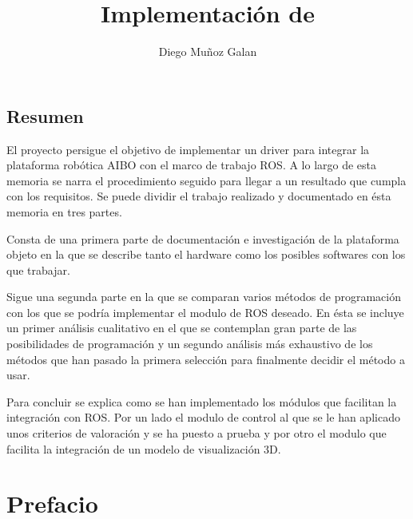 \documentclass[12pt,a4paper,final,twoside]{book}
\title{Implementación de }
\author{Diego Muñoz Galan}
\begin{document}
\maketitle
\thispagestyle{empty}

\newpage
\paragraph{}
\thispagestyle{empty}
\cleardoublepage

\setcounter{page}{1}
\begin{center}
\section*{Resumen}
\end{center}

El proyecto persigue el objetivo de implementar un driver para integrar la plataforma robótica AIBO con el marco de trabajo ROS. A lo largo de esta memoria se narra el procedimiento seguido para llegar a un resultado que cumpla con los requisitos. 
Se puede dividir el trabajo realizado y documentado en ésta memoria en tres partes.

Consta de una primera parte de documentación e investigación de la plataforma objeto en la que se describe tanto el hardware como los posibles softwares con los que trabajar.

Sigue una segunda parte en la que se comparan varios métodos de programación con los que se podría implementar el modulo de ROS deseado. En ésta se incluye un primer análisis cualitativo en el que se contemplan gran parte de las posibilidades de programación y un segundo análisis más exhaustivo de los métodos que han pasado la primera selección para finalmente decidir el método a usar.

Para concluir se explica como se han implementado los módulos que facilitan la integración con ROS. Por un lado el modulo de control al que se le han aplicado unos criterios de valoración y se ha puesto a prueba y por otro el modulo que facilita la integración de un modelo de visualización 3D.




\newpage
\thispagestyle{empty}
\cleardoublepage

\tableofcontents
\newpage
\listoffigures
\newpage
\listoftables
\newpage


\section{Prefacio}
\end{document}
